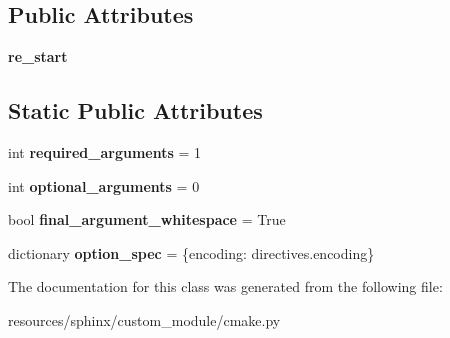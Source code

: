 \subsection*{Public Attributes}
\begin{DoxyCompactItemize}
\item 
{\bfseries re\+\_\+start}\hypertarget{classcmake_1_1CMakeModule_a8bdaac2e5425f8a443a797e31a2e3f24}{}\label{classcmake_1_1CMakeModule_a8bdaac2e5425f8a443a797e31a2e3f24}

\end{DoxyCompactItemize}
\subsection*{Static Public Attributes}
\begin{DoxyCompactItemize}
\item 
int {\bfseries required\+\_\+arguments} = 1\hypertarget{classcmake_1_1CMakeModule_a8611294687a040b621ee65c24bdf4bf3}{}\label{classcmake_1_1CMakeModule_a8611294687a040b621ee65c24bdf4bf3}

\item 
int {\bfseries optional\+\_\+arguments} = 0\hypertarget{classcmake_1_1CMakeModule_a5b3ba9afdee1ce2a9ef4a4372804586b}{}\label{classcmake_1_1CMakeModule_a5b3ba9afdee1ce2a9ef4a4372804586b}

\item 
bool {\bfseries final\+\_\+argument\+\_\+whitespace} = True\hypertarget{classcmake_1_1CMakeModule_a9101f08e555f3d9e7f45d766194bc50f}{}\label{classcmake_1_1CMakeModule_a9101f08e555f3d9e7f45d766194bc50f}

\item 
dictionary {\bfseries option\+\_\+spec} = \{\textquotesingle{}encoding\textquotesingle{}\+: directives.\+encoding\}\hypertarget{classcmake_1_1CMakeModule_adb45adc58cfd303e9efb70792cd2f7f4}{}\label{classcmake_1_1CMakeModule_adb45adc58cfd303e9efb70792cd2f7f4}

\end{DoxyCompactItemize}


The documentation for this class was generated from the following file\+:\begin{DoxyCompactItemize}
\item 
resources/sphinx/custom\+\_\+module/cmake.\+py\end{DoxyCompactItemize}
